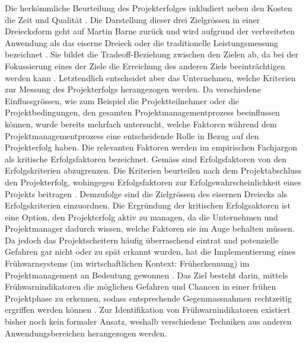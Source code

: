 Die herkömmliche Beurteilung des Projekterfolges inkludiert neben den Kosten die Zeit und Qualität \citep{Atk1999}. Die Darstellung dieser drei Zielgrössen in einer Dreiecksform geht auf Martin Barne zurück und wird aufgrund der verbreiteten Anwendung als das eiserne Dreieck oder die traditionelle Leistungsmessung bezeichnet \citep{kerz14,lock07}. Sie bildet die Tradeoff-Beziehung zwischen den Zielen ab, da bei der Fokussierung eines der Ziele die Erreichung des anderen Ziels beeinträchtigen werden kann \citep[S.~21]{lock07}. Letztendlich entscheidet aber das Unternehmen, welche Kriterien zur Messung des Projekterfolgs herangezogen werden. Da verschiedene Einflussgrössen, wie zum Beispiel die Projektteilnehmer oder die Projektbedingungen, den gesamten Projektmanagementprozess beeinflussen können, wurde bereits mehrfach untersucht, welche Faktoren während dem Projektmanagementprozess eine entscheidende Rolle in Bezug auf den Projekterfolg haben. Die relevanten Faktoren werden im empirischen Fachjargon als kritische Erfolgsfaktoren bezeichnet. Gemäss \citet{BeDeNov2015} sind Erfolgsfaktoren von den Erfolgskriterien abzugrenzen. Die Kriterien beurteilen nach dem Projektabschluss den Projekterfolg, wohingegen Erfolgsfaktoren zur Erfolgswahrscheinlichkeit eines Projekts beitragen \citep*{BeDeNov2015}. Demzufolge sind die Zielgrössen des eisernen Dreiecks als Erfolgskriterien einzuordnen. Die Ergründung der kritischen Erfolgsaktoren ist eine Option, den Projekterfolg aktiv zu managen, da die Unternehmen und Projektmanager dadurch wissen, welche Faktoren sie im Auge behalten müssen. Da jedoch das Projektscheitern häufig überraschend eintrat und potenzielle Gefahren gar nicht oder zu spät erkannt wurden, hat die Implementierung eines Frühwarnsystems (im wirtschaftlichen Kontext: Früherkennung) im Projektmanagement an Bedeutung gewonnen \citep*{WiKlak12,haan13}. Das Ziel besteht darin, mittels Frühwarnindikatoren die möglichen Gefahren und Chancen in einer frühen Projektphase zu erkennen, sodass entsprechende Gegenmassnahmen rechtzeitig ergriffen werden können \citep{haankra13}. Zur Identifikation von Frühwarnindikatoren existiert bisher noch kein formaler Ansatz, weshalb verschiedene Techniken aus anderen Anwendungsbereichen herangezogen werden.
\newline\newline
